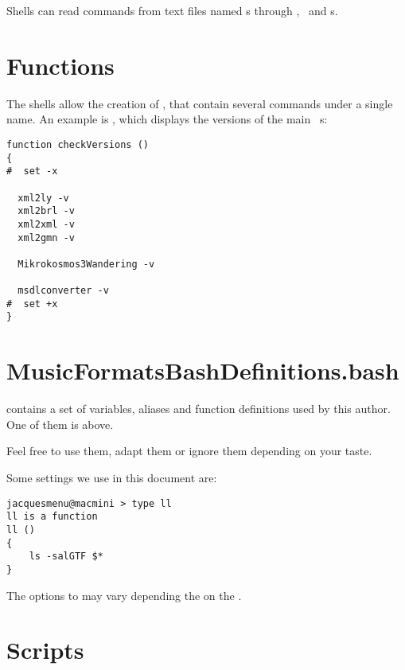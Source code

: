 Shells can read commands from text files named s through , \outputRedirection\ and \pipe s.


\section{Functions}

The shells allow the creation of , that contain several commands under a single name. An example is , which displays the versions of the main \mf\ \service s:
\begin{lstlisting}[language=Terminal]
function checkVersions ()
{
#  set -x

  xml2ly -v
  xml2brl -v
  xml2xml -v
  xml2gmn -v

  Mikrokosmos3Wandering -v

  msdlconverter -v
#  set +x
}
\end{lstlisting}


\section{MusicFormatsBashDefinitions.bash}

 contains a set of variables, aliases and function definitions used by this author. One of them is  above.

Feel free to use them, adapt them or ignore them depending on your taste.

Some settings we use in this document are:
\begin{lstlisting}[language=Terminal]
jacquesmenu@macmini > type ll
ll is a function
ll ()
{
    ls -salGTF $*
}
\end{lstlisting}
The options to  may vary depending the on the \OS.

\section{Scripts}

